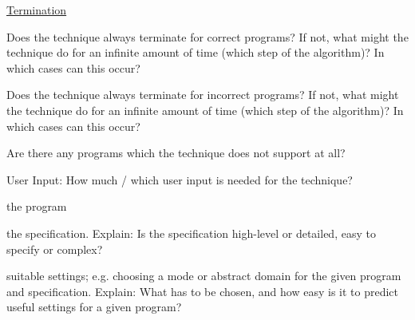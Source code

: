 \documentclass[a4paper]{article}
\begin{document}
\begin{minipage}[t]{0.16\linewidth}
\begin{betterlist}
\begin{betterlist}
\begin{betterlist}
			\end{betterlist}
			\item \underline{Termination}
			\begin{betterlist}
				\item Does the technique always terminate for correct programs? If not, what might the technique do for an infinite amount of time (which step of the algorithm)? In which cases can this occur?

				\item Does the technique always terminate for incorrect programs? If not, what might the technique do for an infinite amount of time (which step of the algorithm)? In which cases can this occur?

			\end{betterlist}
			\item Are there any programs which the technique does not support at all?

			\framebox[0.95\textwidth][l]{\parbox{0.91\textwidth}{
  \begin{betterlist}
      \item TODO
  \end{betterlist}
				}}
		\end{betterlist}
		\item \alert{User Input:} How much / which user input is needed for the technique?
		\begin{betterlist}
			\item \checkboxChecked the program
			\item \checkboxHalfChecked the specification. Explain: Is the specification high-level or detailed, easy to specify or complex?

			\item \checkboxUnchecked suitable settings; e.g. choosing a mode or abstract domain for the given program and specification. Explain: What has to be chosen, and how easy is it to predict useful settings for a given program?


\end{betterlist}
\end{betterlist}
\end{minipage}
\end{document}
